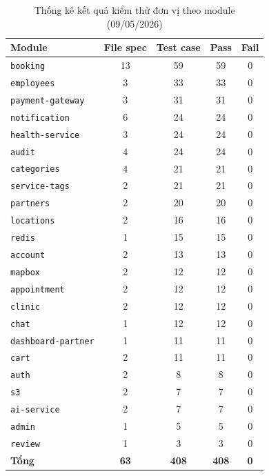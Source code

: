 \begin{table}[H]
\centering
\begin{tabular}{|l|c|c|c|c|}
\hline
\textbf{Module} & \textbf{File spec} & \textbf{Test case} & \textbf{Pass} & \textbf{Fail} \\
\hline
\texttt{booking} & 13 & 59 & 59 & 0 \\
\hline
\texttt{employees} & 3 & 33 & 33 & 0 \\
\hline
\texttt{payment-gateway} & 3 & 31 & 31 & 0 \\
\hline
\texttt{notification} & 6 & 24 & 24 & 0 \\
\hline
\texttt{health-service} & 3 & 24 & 24 & 0 \\
\hline
\texttt{audit} & 4 & 24 & 24 & 0 \\
\hline
\texttt{categories} & 4 & 21 & 21 & 0 \\
\hline
\texttt{service-tags} & 2 & 21 & 21 & 0 \\
\hline
\texttt{partners} & 2 & 20 & 20 & 0 \\
\hline
\texttt{locations} & 2 & 16 & 16 & 0 \\
\hline
\texttt{redis} & 1 & 15 & 15 & 0 \\
\hline
\texttt{account} & 2 & 13 & 13 & 0 \\
\hline
\texttt{mapbox} & 2 & 12 & 12 & 0 \\
\hline
\texttt{appointment} & 2 & 12 & 12 & 0 \\
\hline
\texttt{clinic} & 2 & 12 & 12 & 0 \\
\hline
\texttt{chat} & 1 & 12 & 12 & 0 \\
\hline
\texttt{dashboard-partner} & 1 & 11 & 11 & 0 \\
\hline
\texttt{cart} & 2 & 11 & 11 & 0 \\
\hline
\texttt{auth} & 2 & 8 & 8 & 0 \\
\hline
\texttt{s3} & 2 & 7 & 7 & 0 \\
\hline
\texttt{ai-service} & 2 & 7 & 7 & 0 \\
\hline
\texttt{admin} & 1 & 5 & 5 & 0 \\
\hline
\texttt{review} & 1 & 3 & 3 & 0 \\
\hline
\textbf{Tổng} & \textbf{63} & \textbf{408} & \textbf{408} & \textbf{0} \\
\hline
\end{tabular}
\caption{Thống kê kết quả kiểm thử đơn vị theo module (09/05/2026)}
\label{tab:unittest_stats}
\end{table}

